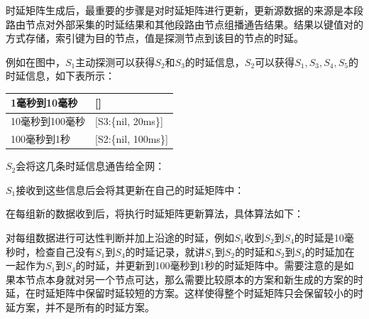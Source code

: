 时延矩阵生成后，最重要的步骤是对时延矩阵进行更新，更新源数据的来源是本段路由节点对外部采集的时延结果和其他段路由节点组播通告结果。结果以键值对的方式存储，索引键为目的节点，值是探测节点到该目的节点的时延。

例如在图中，$S_1$主动探测可以获得$S_2$和$S_3$的时延信息，$S_2$可以获得$S_1, S_3, S_4, S_5$的时延信息，如下表所示：

\begin{table}[htbp]
\center
\begin{tabular}{|l|l|}
\hline
1毫秒到10毫秒 & {[}{]} \\ \hline
10毫秒到100毫秒 & {[}S3:\{nil, 20ms\}{]} \\ \hline
100毫秒到1秒 & {[}S2:\{nil, 100ms\}{]} \\ \hline
\end{tabular}
\end{table}

$S_2$会将这几条时延信息通告给全网：

\begin{table}[htbp]
\center
{}
\end{table}

$S_1$接收到这些信息后会将其更新在自己的时延矩阵中：

\begin{table}[htbp]
\center
{}
\end{table}

在每组新的数据收到后，将执行时延矩阵更新算法，具体算法如下：

对每组数据进行可达性判断并加上沿途的时延，例如$S_1$收到$S_2$到$S_4$的时延是10毫秒时，检查自己没有$S_1$到$S_4$的时延记录，就讲$S_1$到$S_2$的时延和$S_2$到$S_4$的时延加在一起作为$S_1$到$S_4$的时延，并更新到100毫秒到1秒的时延矩阵中。需要注意的是如果本节点本身就对另一个节点可达，那么需要比较原本的方案和新生成的方案的时延，在时延矩阵中保留时延较短的方案。这样使得整个时延矩阵只会保留较小的时延方案，并不是所有的时延方案。

